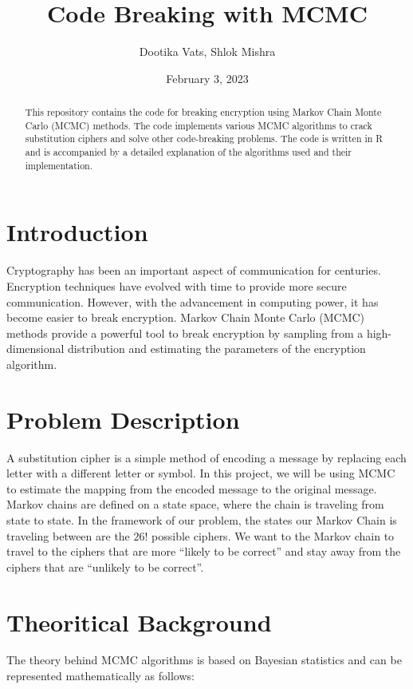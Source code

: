 \documentclass{article}
\title{Code Breaking with MCMC}
\author{Dootika Vats, Shlok Mishra}
\date{February 3, 2023}
\begin{document}
\maketitle

\begin{abstract}
This repository contains the code for breaking encryption using Markov Chain Monte Carlo (MCMC) methods. The code implements various MCMC algorithms to crack substitution ciphers and solve other code-breaking problems. The code is written in R and is accompanied by a detailed explanation of the algorithms used and their implementation.
\end{abstract}

\section{Introduction}

Cryptography has been an important aspect of communication for centuries. Encryption techniques have evolved with time to provide more secure communication. However, with the advancement in computing power, it has become easier to break encryption. Markov Chain Monte Carlo (MCMC) methods provide a powerful tool to break encryption by sampling from a high-dimensional distribution and estimating the parameters of the encryption algorithm.


\section{Problem Description}

A substitution cipher is a simple method of encoding a message by replacing each letter with a different letter or symbol. In this project, we will be using MCMC to estimate the mapping from the encoded message to the original message.
Markov chains are defined on a state space, where the chain is traveling from state to state. In the framework of our problem, the states our Markov Chain is traveling between are the $26!$ possible ciphers. We want to the Markov chain to travel to the ciphers that are more “likely to be correct” and stay away from the ciphers that are “unlikely to be correct”.

\section{Theoritical Background}

The theory behind MCMC algorithms is based on Bayesian statistics and can be represented mathematically as follows:
\end{document}
